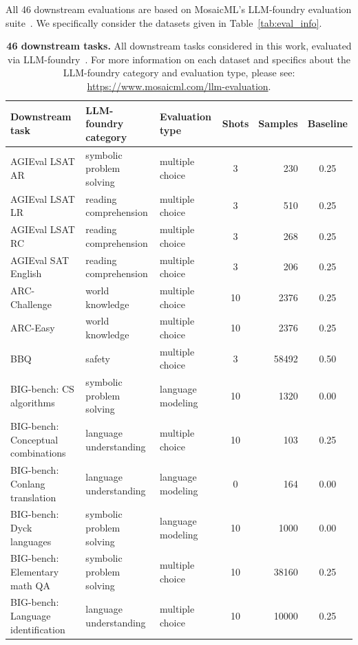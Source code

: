 \documentclass[dvipsnames,11pt]{article}
\begin{document}
\begin{appendix}
All 46 downstream evaluations are based on MosaicML's LLM-foundry evaluation suite~\cite{mosaicml}.
We specifically consider the datasets given in Table~\ref{tab:eval_info}.
\begin{table}[t!]
\centering
\scriptsize
\caption{\textbf{46 downstream tasks.} All downstream tasks considered in this work, evaluated via LLM-foundry~\cite{mosaicml}.
For more information on each dataset and specifics about the LLM-foundry category and evaluation type, please see: \url{https://www.mosaicml.com/llm-evaluation}.
}
\begin{tabular}{lllcrc}
\toprule
Downstream task & LLM-foundry category & Evaluation type & Shots & Samples & Baseline\\\midrule
AGIEval LSAT AR~\cite{zhong2023agieval,zhong2019jec,Wang2021FromLT} & symbolic problem solving & multiple choice & 3 & 230 & 0.25\\
AGIEval LSAT LR~\cite{zhong2023agieval,zhong2019jec,Wang2021FromLT} & reading comprehension & multiple choice & 3 & 510 & 0.25\\
AGIEval LSAT RC~\cite{zhong2023agieval,zhong2019jec,Wang2021FromLT} & reading comprehension & multiple choice & 3 & 268 & 0.25\\
AGIEval SAT English~\cite{zhong2023agieval} & reading comprehension & multiple choice & 3 & 206 & 0.25\\
ARC-Challenge~\cite{arc} & world knowledge & multiple choice & 10 & 2376 & 0.25\\
ARC-Easy~\cite{arc} & world knowledge & multiple choice & 10 & 2376 & 0.25\\
BBQ~\cite{bbq} & safety & multiple choice & 3 & 58492 & 0.50\\
BIG-bench: CS algorithms~\cite{srivastava2023beyond} & symbolic problem solving & language modeling & 10 & 1320 & 0.00\\
BIG-bench: Conceptual combinations~\cite{srivastava2023beyond} & language understanding & multiple choice & 10 & 103 & 0.25\\
BIG-bench: Conlang translation~\cite{srivastava2023beyond} & language understanding & language modeling & 0 & 164 & 0.00\\
BIG-bench: Dyck languages~\cite{srivastava2023beyond} & symbolic problem solving & language modeling & 10 & 1000 & 0.00\\
BIG-bench: Elementary math QA~\cite{srivastava2023beyond} & symbolic problem solving & multiple choice & 10 & 38160 & 0.25\\
BIG-bench: Language identification~\cite{srivastava2023beyond} & language understanding & multiple choice & 10 & 10000 & 0.25\\

\end{tabular}
\end{table}
\end{appendix}
\end{document}
